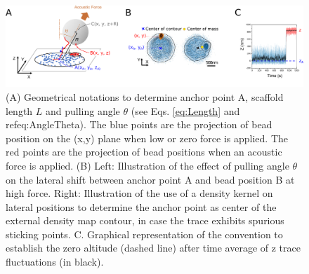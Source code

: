 \documentclass{biophys-new}
\begin{document}
\begin{figure}[hbt!]
	\centering

	\includegraphics[width=1\linewidth]{Figures/figS2.png}

	\caption{(A) Geometrical notations to determine anchor point A, scaffold length $L$ and pulling angle $\theta$ (see Eqs. \ref{eq:Length} and ref{eq:AngleTheta}). The blue points are the projection of bead position on the (x,y) plane when low or zero force is applied. The red points are the projection of bead positions when an acoustic force is applied. (B) Left: Illustration of the effect of pulling angle $\theta$ on the lateral shift between anchor point A and bead position B at high force. Right: Illustration of the use of a density kernel on lateral positions to determine the anchor point as center of the external density map contour, in case the trace exhibits spurious sticking points. C. Graphical representation of the convention to establish the zero altitude (dashed line) after time average of z trace fluctuations (in black).}
	\label{fig:Lengthcalculation}
\end{figure}


\end{document}
